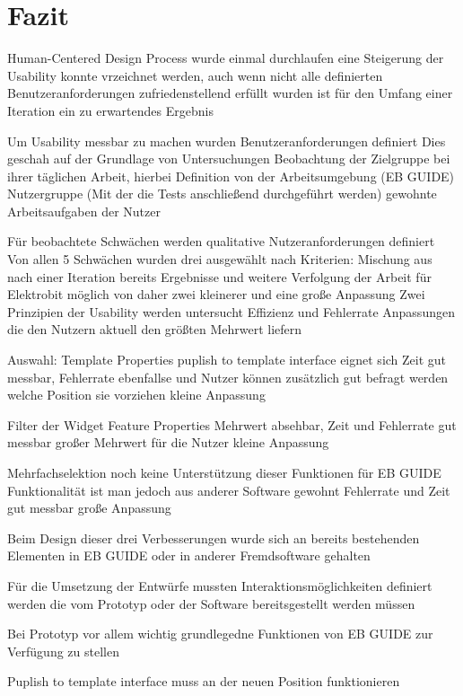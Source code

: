 \chapter{Fazit}\label{ch:summary}

Human-Centered Design Process wurde einmal durchlaufen
eine Steigerung der Usability konnte vrzeichnet werden, auch wenn nicht alle definierten Benutzeranforderungen zufriedenstellend erfüllt wurden
ist für den Umfang einer Iteration ein zu erwartendes Ergebnis

Um Usability messbar zu machen wurden Benutzeranforderungen definiert
Dies geschah auf der Grundlage von Untersuchungen
	Beobachtung der Zielgruppe bei ihrer täglichen Arbeit, hierbei Definition von
		der Arbeitsumgebung (EB GUIDE)
		Nutzergruppe (Mit der die Tests anschließend durchgeführt werden)
		gewohnte Arbeitsaufgaben der Nutzer

Für beobachtete Schwächen werden qualitative Nutzeranforderungen definiert
Von allen 5 Schwächen wurden drei ausgewählt 
	nach Kriterien:
		Mischung aus nach einer Iteration bereits Ergebnisse und weitere Verfolgung der Arbeit für Elektrobit möglich
			von daher zwei kleinerer und eine große Anpassung
		Zwei Prinzipien der Usability werden untersucht
			Effizienz und Fehlerrate
		Anpassungen die den Nutzern aktuell den größten Mehrwert liefern

	Auswahl:
		Template Properties puplish to template interface eignet sich
			Zeit gut messbar, Fehlerrate ebenfallse und Nutzer können zusätzlich gut befragt werden welche Position sie vorziehen
			kleine Anpassung
	
		Filter der Widget Feature Properties
			Mehrwert absehbar, Zeit und Fehlerrate gut messbar
			großer Mehrwert für die Nutzer
			kleine Anpassung

		Mehrfachselektion	
			noch keine Unterstützung dieser Funktionen für EB GUIDE
			Funktionalität ist man jedoch aus anderer Software gewohnt
			Fehlerrate und Zeit gut messbar
			große Anpassung

Beim Design dieser drei Verbesserungen wurde sich an bereits bestehenden Elementen in EB GUIDE oder in anderer Fremdsoftware gehalten

Für die Umsetzung der Entwürfe mussten Interaktionsmöglichkeiten definiert werden die vom Prototyp oder der Software bereitsgestellt werden müssen
	
	Bei Prototyp vor allem wichtig grundlegedne Funktionen von EB GUIDE zur Verfügung zu stellen

	Puplish to template interface muss an der neuen Position funktionieren
	
